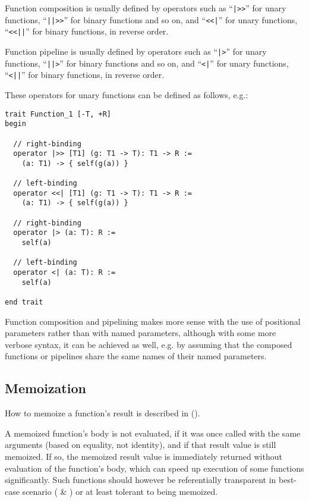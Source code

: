 Function composition is usually defined by operators such as ``\lstinline!|>>!'' for unary functions, ``\lstinline!||>>!'' for binary functions and so on, and ``\lstinline!<<|!'' for unary functions, ``\lstinline!<<||!'' for binary functions, in reverse order. 

Function pipeline is usually defined by operators such as ``\lstinline!|>!'' for unary functions, ``\lstinline!||>!'' for binary functions and so on, and ``\lstinline!<|!'' for unary functions, ``\lstinline!<||!'' for binary functions, in reverse order. 

These operators for unary functions can be defined as follows, e.g.:
\begin{lstlisting}
trait Function_1 [-T, +R]
begin

  // right-binding
  operator |>> [T1] (g: T1 -> T): T1 -> R := 
    (a: T1) -> { self(g(a)) }

  // left-binding
  operator <<| [T1] (g: T1 -> T): T1 -> R :=
    (a: T1) -> { self(g(a)) }

  // right-binding
  operator |> (a: T): R :=
    self(a)

  // left-binding
  operator <| (a: T): R := 
    self(a)
    
end trait
\end{lstlisting}

Function composition and pipelining makes more sense with the use of positional parameters rather than with named parameters, although with some more verbose syntax, it can be achieved as well, e.g. by assuming that the composed functions or pipelines share the same names of their named parameters. 





\subsection{Memoization}
\label{sec:memoization}

How to memoize a function's result is described in ().

A memoized function's body is not evaluated, if it was once called with the same arguments (based on equality, not identity), and if that result value is still memoized. If so, the memoized result value is immediately returned without evaluation of the function's body, which can speed up execution of some functions significantly. Such functions should however be referentially transparent in best-case scenario ( \& ) or at least tolerant to being memoized. 

